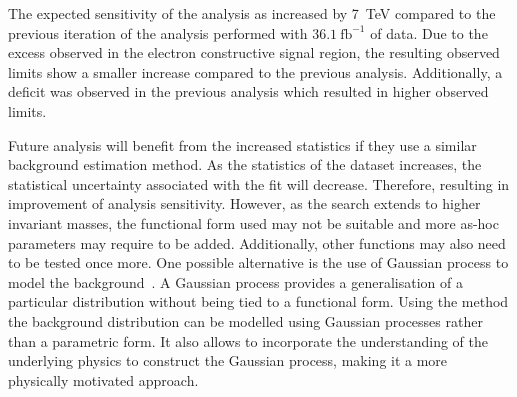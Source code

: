 The expected sensitivity of the analysis as increased by \SI{7}{\tera\electronvolt} compared to the previous iteration of the analysis performed with $\SI{36.1}{\femto\barn}^{-1}$ of data. Due to the excess observed in the electron constructive signal region, the resulting  observed limits show a smaller increase compared to the previous analysis. Additionally, a deficit was observed in the previous analysis which resulted in higher observed limits. 

Future analysis will benefit from the increased statistics if they use a similar background estimation method. As the statistics of the dataset increases, the statistical uncertainty associated with the fit will decrease. Therefore, resulting in improvement of analysis sensitivity. However, as the search extends to higher invariant masses, the functional form used may not be suitable and more as-hoc parameters may require to be added. Additionally, other functions may also need to be tested once more. One possible alternative is the use of Gaussian process to model the background~\cite{frate2017modeling}. A Gaussian process provides a generalisation of a particular distribution without being tied to a functional form. Using the method the background distribution can be modelled using Gaussian processes rather than a parametric form. It also allows to incorporate the understanding of the underlying physics to construct the Gaussian process, making it a more physically motivated approach. 


